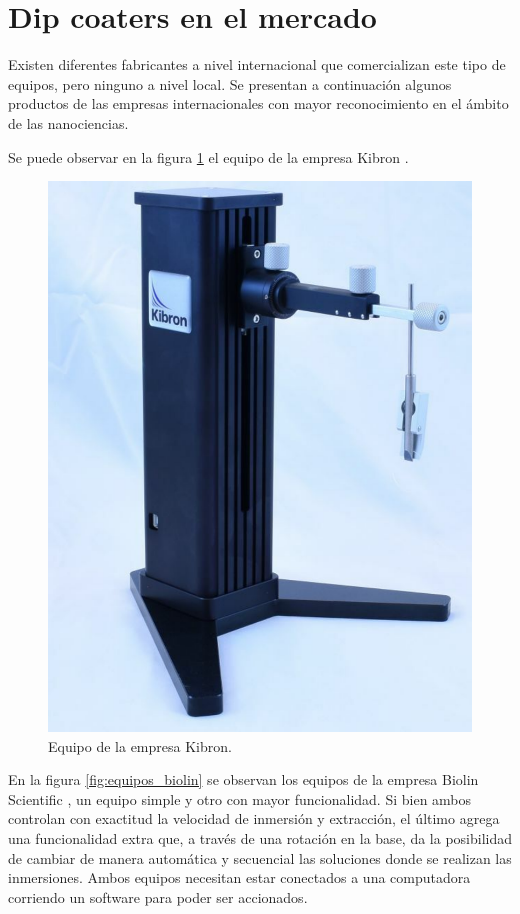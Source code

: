 \label{sec:dip coating}

\section{Dip coaters en el mercado}
\label{sec:mercado}
Existen diferentes fabricantes a nivel internacional que comercializan este tipo de equipos, pero ninguno a nivel local. Se presentan a continuación algunos productos de las empresas internacionales con mayor reconocimiento en el ámbito de las nanociencias. 

Se puede observar en la figura \ref{fig:dip_kibron} el equipo de la empresa Kibron \citep{2_web_kibron}.

\begin{figure}[htbp]
	\centering
	\includegraphics[width=.35\textwidth]{./Figures/kibron.pdf}
	\caption{Equipo de la empresa Kibron.}
	\label{fig:dip_kibron}
\end{figure}

En la figura \ref{fig:equipos_biolin} se observan los equipos de la empresa Biolin Scientific  \citep{1_web_biolin}, un equipo simple y otro con mayor funcionalidad. Si bien ambos controlan con exactitud la velocidad de inmersión y extracción, el último agrega una funcionalidad extra que, a través de una rotación en la base, da la posibilidad de cambiar de manera automática y secuencial las soluciones donde se realizan las inmersiones. Ambos equipos necesitan estar conectados a una computadora corriendo un software para poder ser accionados.

